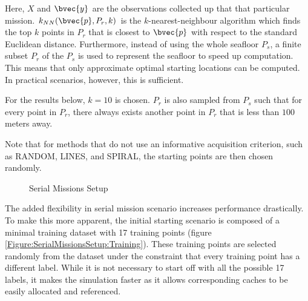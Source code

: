 			Here, $X$ and $\bvec{y}$ are the observations collected up that that particular mission. $k_{NN}(\bvec{p}, P_{r}, k)$ is the $k$-nearest-neighbour algorithm which finds the top $k$ points in $P_{r}$ that is closest to $\bvec{p}$ with respect to the standard Euclidean distance. Furthermore, instead of using the whole seafloor $P_{s}$, a finite subset $P_{r}$ of the $P_{s}$ is used to represent the seafloor to speed up computation. This means that only approximate optimal starting locations can be computed. In practical scenarios, however, this is sufficient.
			
			For the results below, $k = 10$ is chosen. $P_{r}$ is also sampled from $P_{s}$ such that for every point in $P_{r}$, there always exists another point in $P_{r}$ that is less than $100$ meters away.
			
			Note that for methods that do not use an informative acquisition criterion, such as RANDOM, LINES, and SPIRAL, the starting points are then chosen randomly. 
			
			\begin{figure}[!htbp]
			\centering
			\caption{Serial Missions Setup}
			\label{Figure:SerialMissionsSetup}
			\end{figure}
			
			The added flexibility in serial mission scenario increases performance drastically. To make this more apparent, the initial starting scenario is composed of a minimal training dataset with 17 training points (figure \ref{Figure:SerialMissionsSetup:Training}). These training points are selected randomly from the dataset under the constraint that every training point has a different label. While it is not necessary to start off with all the possible 17 labels, it makes the simulation faster as it allows corresponding caches to be easily allocated and referenced.
			
